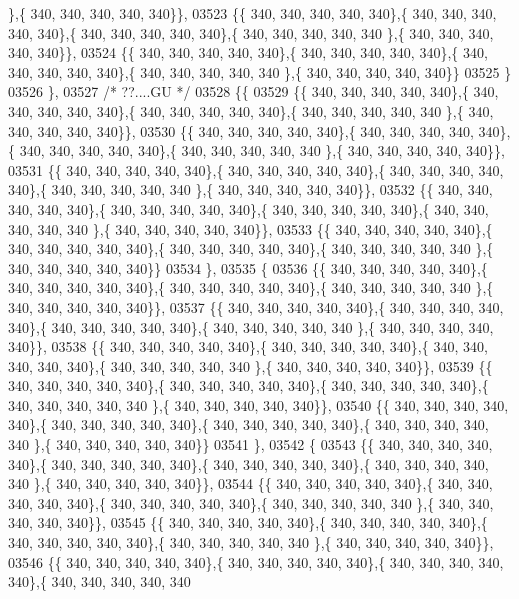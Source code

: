 \begin{DoxyCode}
      \},\{ 340, 340, 340, 340, 340\}\},
03523 \{\{ 340, 340, 340, 340, 340\},\{ 340, 340, 340, 340, 340\},\{ 340, 340, 340, 340, 340\},\{ 340, 340, 340, 340, 340
      \},\{ 340, 340, 340, 340, 340\}\},
03524 \{\{ 340, 340, 340, 340, 340\},\{ 340, 340, 340, 340, 340\},\{ 340, 340, 340, 340, 340\},\{ 340, 340, 340, 340, 340
      \},\{ 340, 340, 340, 340, 340\}\}
03525 \}
03526 \},
03527 \textcolor{comment}{/* ??....GU */}
03528 \{\{
03529 \{\{ 340, 340, 340, 340, 340\},\{ 340, 340, 340, 340, 340\},\{ 340, 340, 340, 340, 340\},\{ 340, 340, 340, 340, 340
      \},\{ 340, 340, 340, 340, 340\}\},
03530 \{\{ 340, 340, 340, 340, 340\},\{ 340, 340, 340, 340, 340\},\{ 340, 340, 340, 340, 340\},\{ 340, 340, 340, 340, 340
      \},\{ 340, 340, 340, 340, 340\}\},
03531 \{\{ 340, 340, 340, 340, 340\},\{ 340, 340, 340, 340, 340\},\{ 340, 340, 340, 340, 340\},\{ 340, 340, 340, 340, 340
      \},\{ 340, 340, 340, 340, 340\}\},
03532 \{\{ 340, 340, 340, 340, 340\},\{ 340, 340, 340, 340, 340\},\{ 340, 340, 340, 340, 340\},\{ 340, 340, 340, 340, 340
      \},\{ 340, 340, 340, 340, 340\}\},
03533 \{\{ 340, 340, 340, 340, 340\},\{ 340, 340, 340, 340, 340\},\{ 340, 340, 340, 340, 340\},\{ 340, 340, 340, 340, 340
      \},\{ 340, 340, 340, 340, 340\}\}
03534 \},
03535 \{
03536 \{\{ 340, 340, 340, 340, 340\},\{ 340, 340, 340, 340, 340\},\{ 340, 340, 340, 340, 340\},\{ 340, 340, 340, 340, 340
      \},\{ 340, 340, 340, 340, 340\}\},
03537 \{\{ 340, 340, 340, 340, 340\},\{ 340, 340, 340, 340, 340\},\{ 340, 340, 340, 340, 340\},\{ 340, 340, 340, 340, 340
      \},\{ 340, 340, 340, 340, 340\}\},
03538 \{\{ 340, 340, 340, 340, 340\},\{ 340, 340, 340, 340, 340\},\{ 340, 340, 340, 340, 340\},\{ 340, 340, 340, 340, 340
      \},\{ 340, 340, 340, 340, 340\}\},
03539 \{\{ 340, 340, 340, 340, 340\},\{ 340, 340, 340, 340, 340\},\{ 340, 340, 340, 340, 340\},\{ 340, 340, 340, 340, 340
      \},\{ 340, 340, 340, 340, 340\}\},
03540 \{\{ 340, 340, 340, 340, 340\},\{ 340, 340, 340, 340, 340\},\{ 340, 340, 340, 340, 340\},\{ 340, 340, 340, 340, 340
      \},\{ 340, 340, 340, 340, 340\}\}
03541 \},
03542 \{
03543 \{\{ 340, 340, 340, 340, 340\},\{ 340, 340, 340, 340, 340\},\{ 340, 340, 340, 340, 340\},\{ 340, 340, 340, 340, 340
      \},\{ 340, 340, 340, 340, 340\}\},
03544 \{\{ 340, 340, 340, 340, 340\},\{ 340, 340, 340, 340, 340\},\{ 340, 340, 340, 340, 340\},\{ 340, 340, 340, 340, 340
      \},\{ 340, 340, 340, 340, 340\}\},
03545 \{\{ 340, 340, 340, 340, 340\},\{ 340, 340, 340, 340, 340\},\{ 340, 340, 340, 340, 340\},\{ 340, 340, 340, 340, 340
      \},\{ 340, 340, 340, 340, 340\}\},
03546 \{\{ 340, 340, 340, 340, 340\},\{ 340, 340, 340, 340, 340\},\{ 340, 340, 340, 340, 340\},\{ 340, 340, 340, 340, 340

\end{DoxyCode}
